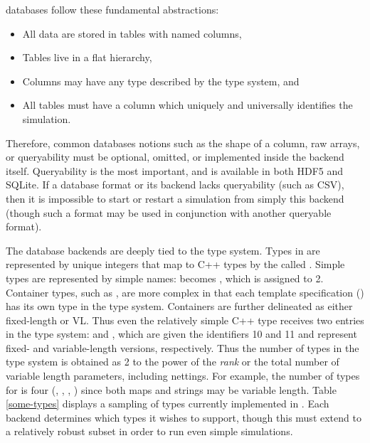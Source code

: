 \Cyclus databases follow these fundamental abstractions:
\begin{itemize}
    \item All data are stored in tables with named columns,
    \item Tables live in a flat hierarchy,
    \item Columns may have any type described by the \cyclus type system, and
    \item All tables must have a  column which uniquely and 
          universally identifies the simulation.
\end{itemize}
Therefore, common databases notions such as the shape of a column, raw arrays, or
queryability must be optional, omitted, or implemented inside the backend itself.
Queryability is the most important, and is available in both \gls{HDF5} and 
\gls{SQLite}. If a database format or its backend lacks 
queryability (such as \gls{CSV}), then it is impossible to start or restart a 
\cyclus simulation from simply this backend (though such a format may be used in 
conjunction with another queryable format). 

The database backends are deeply tied to the \cyclus type system. Types in \cyclus
are represented by unique integers that map to C++ types by the  called .
Simple types are represented by simple names:  becomes
, which is assigned to 2. Container types, such as ,
are more complex in that each template specification () has
its own type in the \cyclus type system.  Containers are further delineated
as either fixed-length or \gls{VL}. Thus even the 
relatively simple C++ type  receives two entries in the 
\cyclus type system:  and , which are given 
the identifiers 10 and 11 and represent fixed- and variable-length versions, 
respectively.  Thus the number of types in the \cyclus type system is obtained as 
2 to the power of the \emph{rank} or the total number of variable length parameters, 
including nettings.
For example, the number of \cyclus types for  is 
four (, , , 
) since both maps and strings may be variable length.
Table \ref{some-types} displays a sampling of types currently implemented in 
\cyclus.
Each backend determines which types it wishes to support, though this must extend 
to a relatively robust subset in order to run even simple simulations.

